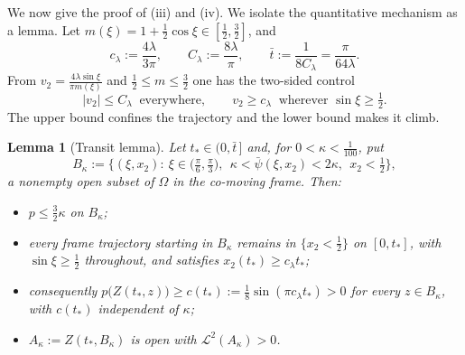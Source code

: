\documentclass[11pt]{amsart}
\newtheorem{lemma}[theorem]{Lemma}
\theoremstyle{definition}
\newcommand{\LL}[1]{\mathcal{L}^{#1}}
\begin{document}
We now give the proof of  (iii) and (iv).
We isolate the quantitative mechanism as a lemma. Let 
$m(\xi)=1+\tfrac12\cos\xi\in[\tfrac12,\tfrac32]$, and 
\begin{equation}\label{eq:speeds}
c_\lambda:=\frac{4\lambda}{3\pi},
\qquad
C_\lambda:=\frac{8\lambda}{\pi},
\qquad
\bar t:=\frac{1}{8C_\lambda}=\frac{\pi}{64\lambda} .
\end{equation}
From $v_2=\tfrac{4\lambda\sin\xi}{\pi m(\xi)}$ and
$\tfrac12\le m\le\tfrac32$ one has the two-sided control
\begin{equation}\label{eq:twosided}
|v_2|\le C_\lambda \ \text{ everywhere},
\qquad
v_2\ge c_\lambda \ \text{ wherever }\sin\xi\ge\tfrac12.
\end{equation}
The upper bound  confines the trajectory and the lower
bound  makes it climb.

\begin{lemma}[Transit lemma]\label{lem:transit}
Let $t_*\in(0,\bar t\,]$ and, for $0<\kappa<\tfrac{1}{100}$, put
\[
B_\kappa:=\Big\{(\xi,x_2):\ \xi\in\big(\tfrac\pi6,\tfrac\pi3\big),
\ \ \kappa<\bar\psi(\xi,x_2)<2\kappa,\ \ x_2<\tfrac12\Big\},
\]
a nonempty open subset of $\Omega$ in the co-moving frame. Then:
\begin{itemize}
\item[(a)] $p\le\tfrac32\kappa$ on $B_\kappa$;
\item[(b)] every frame trajectory starting in $B_\kappa$ remains in
$\{x_2<\tfrac12\}$ on $[0,t_*]$, with $\sin\xi\ge\tfrac12$
throughout, and satisfies $x_2(t_*)\ge c_\lambda t_*$;
\item[(c)] consequently $p\big(Z(t_*,z)\big)\ge
c(t_*):=\tfrac18\sin(\pi c_\lambda t_*)>0$ for every $z\in
B_\kappa$, with $c(t_*)$ independent of $\kappa$;
\item[(d)] $A_\kappa:=Z(t_*,B_\kappa)$ is open with
$\LL{2}(A_\kappa)>0$.
\end{itemize}
\end{lemma}
\end{document}

